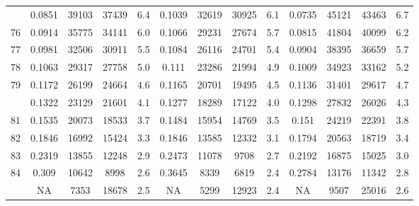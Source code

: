 \documentclass[
  14pt,
]{article}
\begin{document}
\begin{longtable}[t]{lcccccccccccc}
\addlinespace
75 & 0.0851 & 39103 & 37439 & 6.4 & 0.1039 & 32619 & 30925 & 6.1 & 0.0735 & 45121 & 43463 & 6.7\\
76 & 0.0914 & 35775 & 34141 & 6.0 & 0.1066 & 29231 & 27674 & 5.7 & 0.0815 & 41804 & 40099 & 6.2\\
77 & 0.0981 & 32506 & 30911 & 5.5 & 0.1084 & 26116 & 24701 & 5.4 & 0.0904 & 38395 & 36659 & 5.7\\
78 & 0.1063 & 29317 & 27758 & 5.0 & 0.111 & 23286 & 21994 & 4.9 & 0.1009 & 34923 & 33162 & 5.2\\
79 & 0.1172 & 26199 & 24664 & 4.6 & 0.1165 & 20701 & 19495 & 4.5 & 0.1136 & 31401 & 29617 & 4.7\\
\addlinespace
80 & 0.1322 & 23129 & 21601 & 4.1 & 0.1277 & 18289 & 17122 & 4.0 & 0.1298 & 27832 & 26026 & 4.3\\
81 & 0.1535 & 20073 & 18533 & 3.7 & 0.1484 & 15954 & 14769 & 3.5 & 0.151 & 24219 & 22391 & 3.8\\
82 & 0.1846 & 16992 & 15424 & 3.3 & 0.1846 & 13585 & 12332 & 3.1 & 0.1794 & 20563 & 18719 & 3.4\\
83 & 0.2319 & 13855 & 12248 & 2.9 & 0.2473 & 11078 & 9708 & 2.7 & 0.2192 & 16875 & 15025 & 3.0\\
84 & 0.309 & 10642 & 8998 & 2.6 & 0.3645 & 8339 & 6819 & 2.4 & 0.2784 & 13176 & 11342 & 2.8\\
\addlinespace
85 & NA & 7353 & 18678 & 2.5 & NA & 5299 & 12923 & 2.4 & NA & 9507 & 25016 & 2.6\\*
\end{longtable}
\end{document}
